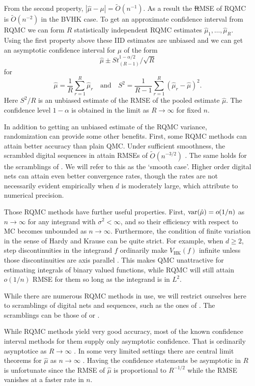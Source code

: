 \documentclass{article}
\newcommand{\fred}[1]{\begingroup\color{red}#1\endgroup}
\renewcommand{\ge}{\geqslant}
\newcommand{\hk}{\mathrm{HK}}
\begin{document}
From the second property, $|\hat\mu-\mu|=\tilde O(n^{-1})$.
As a result the \fred{\sout{R}}MSE of RQMC is $\tilde O(n^{-2})$
in the BVHK case.
To get an approximate confidence interval from RQMC
we can form $R$ statistically independent RQMC estimates
$\hat\mu_1,\dots,\hat\mu_R$. Using the first property
above these IID estimates are unbiased and we can get
an asymptotic confidence interval for $\mu$ of the form
$$
\hat\mu \pm S t_{(R-1)}^{1-\alpha/2}/\sqrt{R}
$$
for
$$
\hat\mu = \frac1R\sum_{r=1}^R\hat\mu_r
\quad\text{and}\quad
S^2 = \frac1{R-1}\sum_{r=1}^R(\hat\mu_r-\hat\mu)^2.
$$
Here $S^2/R$ is an unbiased estimate of the RMSE
of the pooled estimate $\hat\mu$.
The confidence level $1-\alpha$ is obtained in
the limit as $R\to\infty$ \cite{naka:tuff:2024}
for fixed $n$.

In addition to getting an unbiased estimate of
the RQMC variance, randomization can provide
some other benefits.  First, some RQMC methods
can attain better accuracy than plain QMC.
Under sufficient smoothness, the scrambled  digital sequences
in \cite{Owe95} attain RMSEs of $\tilde O(n^{-3/2})$
\cite{Owe97,Owe08a}. The same holds for the scramblings
of \cite{Mat98}. We will refer to this as the `smooth case'.
Higher order digital nets \cite{Dic11a} can attain even
better convergence rates, though the rates are not
necessarily evident empirically when $d$ is moderately
large, which \cite{nuyens2010higher} attribute to numerical precision.

Those RQMC methods have further
useful properties.  First,  $\operatorname{var}(\hat\mu) = o(1/n)$ as $n\to\infty$
for any integrand with $\sigma^2<\infty$, and so their
efficiency with respect to MC becomes unbounded as $n\to\infty$.
Furthermore, the condition of finite
variation in the sense of Hardy and Krause can be quite
strict. For example, when $d\ge2$, step discontinuities in the integrand
$f$ ordinarily make $V_{\hk}(f)$ infinite unless those discontinuities
are axis parallel \cite{Owe05a}. This makes QMC
unattractive for estimating integrals of binary
valued functions, while RQMC will still attain
$o(1/n)$ RMSE for them so long as the integrand
is in $L^2$.

While there are numerous RQMC methods in use, we
will restrict ourselves here to scramblings of digital nets
and sequences, such as the ones of \cite{Sob67}.
The scramblings can be those of \cite{Owe95} or
\cite{Mat98}.


While RQMC methods yield very good accuracy, most
of the known confidence interval methods for them
supply only asymptotic confidence. That is ordinarily
asynptotice as $R\to\infty$ \cite{naka:tuff:2024}.
In some very limited settings
there are central limit theorems for $\hat\mu$
as $n\to\infty$ \cite{Loh01}.
Having the confidence statements be asymptotic in $R$
is unfortunate since the RMSE of $\hat\mu$ 
is proportional to $R^{-1/2}$ while the RMSE
vanishes at a faster rate in $n$.
\end{document}
